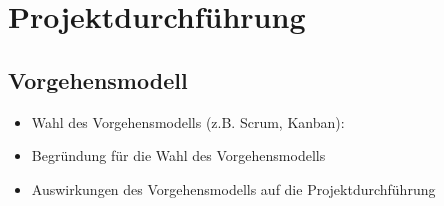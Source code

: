 
\section{Projektdurchführung}\label{projektdurchfuxfchrung}


\subsection{Vorgehensmodell}\label{vorgehensmodell}

\begin{itemize}
\item
  Wahl des Vorgehensmodells (z.B. Scrum, Kanban):
\item
  Begründung für die Wahl des Vorgehensmodells
\item
  Auswirkungen des Vorgehensmodells auf die Projektdurchführung
\end{itemize}

